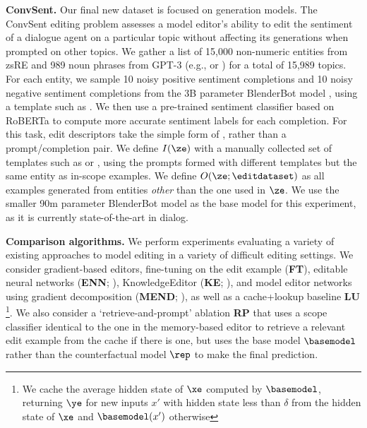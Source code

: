 \textbf{ConvSent.} Our final new dataset is focused on generation models. The ConvSent editing problem assesses a model editor's ability to edit the sentiment of a dialogue agent on a particular topic without affecting its generations when prompted on other topics. We gather a list of 15,000 non-numeric entities from zsRE and 989 noun phrases from GPT-3 \citep{brown2020language} (e.g.,  or ) for a total of 15,989 topics. For each entity, we sample 10 noisy positive sentiment completions and 10 noisy negative sentiment completions from the 3B parameter BlenderBot model \citep{roller2021recipes}, using a template such as . We then use a pre-trained sentiment classifier \citep{heitmann2020} based on RoBERTa \citep{liu2019robustly} to compute more accurate sentiment labels for each completion. For this task, edit descriptors take the simple form of , rather than a prompt/completion pair. We define $I(\ze)$ with a manually collected set of templates such as  or , using the prompts formed with different templates but the same entity as in-scope examples. We define $O(\ze; \editdataset)$ as all examples generated from entities \textit{other} than the one used in $\ze$. We use the smaller 90m parameter BlenderBot model \citep{roller2021recipes} as the base model for this experiment, as it is currently state-of-the-art in dialog. %

\textbf{Comparison algorithms.} 
We perform experiments evaluating a variety of existing approaches to model editing in a variety of difficult editing settings. We consider gradient-based editors, fine-tuning on the edit example (\textbf{FT}), editable neural networks (\textbf{ENN}; \citet{Sinitsin2020Editable}), KnowledgeEditor (\textbf{KE}; \citet{Cao2021EditingFK}), and model editor networks using gradient decomposition (\textbf{MEND}; \citet{mitchell2021fast}), as well as a cache+lookup baseline \textbf{LU} \footnote{We cache the average hidden state of $\xe$ computed by $\basemodel$, returning $\ye$ for new inputs $x'$ with hidden state less than $\delta$ from the hidden state of $\xe$ and $\basemodel(x')$ otherwise}. We also consider a `retrieve-and-prompt' ablation \textbf{RP} that uses a scope classifier identical to the one in the memory-based editor to retrieve a relevant edit example from the cache if there is one, but uses the base model $\basemodel$ rather than the counterfactual model $\rep$ to make the final prediction.

